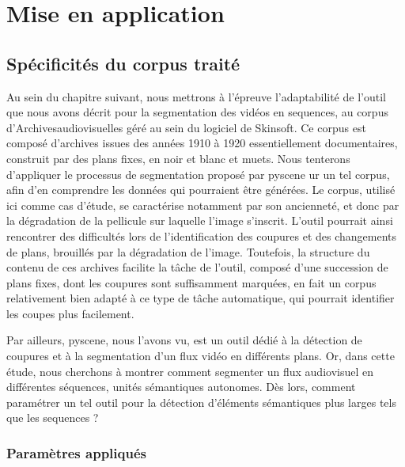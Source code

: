 \section{\label{II_1_C}Mise en application}

\subsection{Spécificités du corpus traité}
Au sein du chapitre suivant, nous mettrons à l’épreuve l’adaptabilité de l’outil que nous avons décrit pour la segmentation des vidéos en \gls{sequence}s, au corpus d'\gls{Archivesaudiovisuelles} géré au sein du logiciel de Skinsoft. Ce corpus est composé d'archives issues des années 1910 à 1920 essentiellement documentaires, construit par des plans fixes, en noir et blanc et muets. Nous tenterons d’appliquer le processus de segmentation proposé par \gls{pyscene} ur un tel corpus, afin d’en comprendre les données qui pourraient être générées. Le corpus, utilisé ici comme cas d'étude, se caractérise notamment par son ancienneté, et donc par la dégradation de la pellicule sur laquelle l’image s’inscrit. L'outil pourrait ainsi rencontrer des difficultés lors de l’identification des coupures et des changements de plans, brouillés par la dégradation de l’image. Toutefois, la structure du contenu de ces archives facilite la tâche de l’outil, composé d’une succession de \gls{plan}s fixes, dont les coupures sont suffisamment marquées, en fait un corpus relativement bien adapté à ce type de tâche automatique, qui pourrait identifier les coupes plus facilement.  

Par ailleurs, \gls{pyscene}, nous l’avons vu, est un outil dédié à la détection de coupures et à la segmentation d’un flux vidéo en différents plans. Or, dans cette étude, nous cherchons à montrer comment segmenter un flux audiovisuel en différentes séquences, unités sémantiques autonomes. Dès lors, comment paramétrer un tel outil pour la détection d'éléments sémantiques plus larges tels que les \gls{sequence}s ?  

\subsubsection{Paramètres appliqués}

